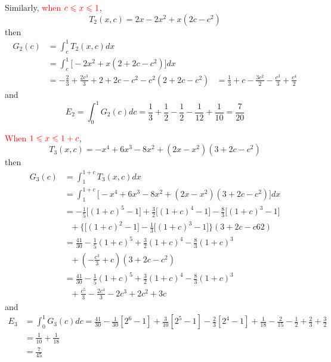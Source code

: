 \documentclass[12pt]{simple_doc}
\begin{document}
    Similarly, \textcolor{red}{when} $\color{red} c \leqslant x \leqslant 1$,
    \begin{equation*}
        T_2(x, c) = 2x - 2x^2 + x(2c - c^2)
    \end{equation*}
    then
    \begin{equation*}
		\begin{aligned}
		G_2(c) &= \int_c^1 T_2(x, c) dx \\
		   &= \int_c^1 \big[- 2x^2 + x(2 + 2c - c^2)\big] dx\\
           &= -\frac{2}{3} + \frac{2c^3}{3} + 2 + 2c -c^2 -c^2(2 + 2c - c^2)
           &= \frac{1}{3} + c - \frac{3c^2}{2} - \frac{c^3}{3} + \frac{c^4}{2}
		\end{aligned}
    \end{equation*}
    and
    \begin{equation*}
        E_2 = \int_0^1 G_2(c)dc = \frac{1}{3} + \frac{1}{2}  - \frac{1}{2}
            - \frac{1}{12} + \frac{1}{10} = \frac{7}{20}
    \end{equation*}

    \textcolor{red}{When} $\color{red} 1 \leqslant x \leqslant 1 + c$,
    \begin{equation*}
        T_3(x, c) = -x^4 +6x^3 -8x^2 + (2x - x^2)(3 + 2c - c^2)
    \end{equation*}
    then
    \begin{equation*}
		\begin{aligned}
		G_3(c) &= \int_1^{1+c} T_3(x, c) dx \\
		   &= \int_1^{1+c} \big[-x^4 +6x^3 -8x^2 + (2x - x^2)(3 + 2c - c^2)\big] dx\\
           &= -\frac{1}{5}\big[(1+c)^5 - 1\big] + \frac{3}{2}\big[(1+c)^4 - 1\big] - \frac{8}{3}\big[(1+c)^3 - 1\big]\\
           &\ \ \ + \Big\{\big[(1+c)^2 - 1\big] - \frac{1}{3}\big[(1+c)^3 - 1\big]\Big\}(3 + 2c - c62)\\
           &= \frac{41}{30} - \frac{1}{5}(1+c)^5 + \frac{3}{2}(1+c)^4 - \frac{8}{3}(1+c)^3\\
           &\ \ \ + (-\frac{c^3}{3} + c)(3 + 2c - c^2)\\
           &= \frac{41}{30} - \frac{1}{5}(1+c)^5 + \frac{3}{2}(1+c)^4 - \frac{8}{3}(1+c)^3\\
           &\ \ \ + \frac{c^5}{3} - \frac{2c^4}{3} -2c^3 + 2c^2 + 3c
		\end{aligned}
    \end{equation*}
    and
    \begin{equation*}
        \begin{aligned}
        E_3 &= \int_0^1 G_3(c)dc = \frac{41}{30} - \frac{1}{30}[2^6 - 1] + \frac{3}{10}[2^5 - 1]
                - \frac{2}{3}[2^4 - 1] + \frac{1}{18} - \frac{2}{15} - \frac{1}{2}
                + \frac{2}{3} + \frac{3}{2}\\
            &= \frac{1}{10} + \frac{1}{18}\\
            &= \frac{7}{45}
        \end{aligned}
    \end{equation*}
\end{document}
